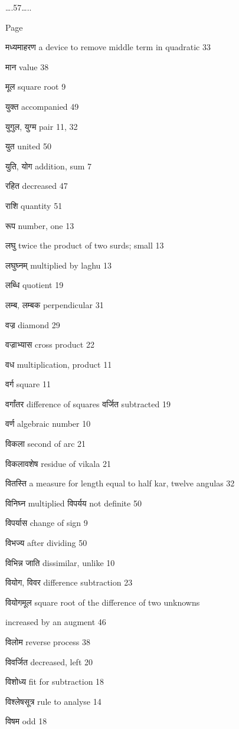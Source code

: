 \documentclass[]{article}
\date{}
\begin{document}
{\ldots{}.57\ldots{}..}

{Page}

{मध्यमाहरण a device to remove middle term in quadratic 33}

{मान value 38}

{मूल square root 9}

{युक्त accompanied 49}

{युगुल, युग्म pair 11, 32}

{युत united 50}

{युति, योग addition, sum 7}

{रहित decreased 47}

{राशि quantity 51}

{रूप number, one 13}

{लघु twice the product of two surds; small 13}

{लघुघ्नम् multiplied by laghu 13}

{लब्धि quotient 19}

{लम्ब, लम्बक perpendicular 31}

{वज्र diamond 29}

{वज्राभ्यास cross product 22}

{वध multiplication, product 11}

{वर्ग square 11}

{वर्गांतर difference of squares वर्जित subtracted 19}

{वर्ण algebraic number 10}

{विकला second of arc 21}

{विकलावशेष residue of vikala 21}

{वितस्ति a measure for length equal to half kar, twelve angulas 32}

{विनिघ्न multiplied विपर्यय not definite 50}

{विपर्यास change of sign 9}

{विभज्य after dividing 50}

{विभिन्न जाति dissimilar, unlike 10}

{वियोग, विवर difference subtraction 23}

{वियोगमूल square root of the difference of two unknowns }

{increased by an augment 46}

{विलोम reverse process 38}

{विवर्जित decreased, left 20}

{विशोध्य fit for subtraction 18}

{विश्लेषसूत्र rule to analyse 14}

{विषम odd 18}
\end{document}
